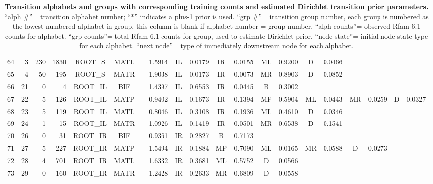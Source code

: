 \documentclass[11pt]{article}
\renewcommand{\baselinestretch}{1.5}
\renewcommand{\baselinestretch}{1.5}
\begin{document}
\begin{table}
\begin{center}
\begin{tabular}{|rr|rr|cc|c|c|cc|cc|cc|cc|cc|cc|}
64  & 3  & 230   & 1830  & ROOT\_S  & MATL & & 1.5914  & IL & 0.0179 & IR & 0.0155 & ML & 0.9200 & D  & 0.0466 &    &  &  &  \\  
65  & 4  & 50    & 195   & ROOT\_S  & MATR & & 1.9038  & IL & 0.0173 & IR & 0.0073 & MR & 0.8903 & D  & 0.0852 &    &  &  &  \\  
66  & 21 & 0     & 4     & ROOT\_IL & BIF  & & 1.4397  & IL & 0.6553 & IR & 0.0445 & B  & 0.3002 &    &        &    &  &  &  \\  
67  & 22 & 5     & 126   & ROOT\_IL & MATP & & 0.9402  & IL & 0.1673 & IR & 0.1394 & MP & 0.5904 & ML & 0.0443 & MR & 0.0259 & D & 0.0327 \\  
68  & 23 & 5     & 119   & ROOT\_IL & MATL & & 0.8046  & IL & 0.3108 & IR & 0.1936 & ML & 0.4610 & D  & 0.0346 &    &  &  &  \\  
69  & 24 & 1     & 15    & ROOT\_IL & MATR & & 1.0926  & IL & 0.1419 & IR & 0.0501 & MR & 0.6538 & D  & 0.1541 &    &  &  &  \\  
70  & 26 & 0     & 31    & ROOT\_IR & BIF  & & 0.9361  & IR & 0.2827 & B  & 0.7173 &    &        &    &        &    &  &  &  \\  
71  & 27 & 5     & 227   & ROOT\_IR & MATP & & 1.5494  & IR & 0.1884 & MP & 0.7090 & ML & 0.0165 & MR & 0.0588 & D  & 0.0273 &  &  \\  
72  & 28 & 4     & 701   & ROOT\_IR & MATL & & 1.6332  & IR & 0.3681 & ML & 0.5752 & D  & 0.0566 &    &        &    &  &  &  \\  
73  & 29 & 0     & 160   & ROOT\_IR & MATR & & 1.2428  & IR & 0.2633 & MR & 0.6809 & D  & 0.0558 &    &        &    &  &  &  \\   \cline{1-6} \cline {8-20} 
\end{tabular}
\end{center}
\normalfont\rmfamily
\caption{\textbf{Transition alphabets and groups with corresponding
    training counts and estimated Dirichlet transition prior parameters.}
  ``alph \#''= transition alphabet number; ``*'' indicates a plus-1
  prior is used. ``grp \#''= transition
  group number, each group is numbered as the lowest numbered alphabet in
  group, this column is blank if alphabet number = group
  number. ``alph counts''= observed Rfam 6.1 counts for
  alphabet. ``grp counts''= total Rfam 6.1 counts for group, used
  to estimate Dirichlet prior. ``node state''= initial node state type for each
  alphabet. ``next node''= type of immediately downstream
  node for each alphabet.}
\label{tbl:transitions}
\end{table}
\renewcommand{\baselinestretch}{1.5}
\end{document}

